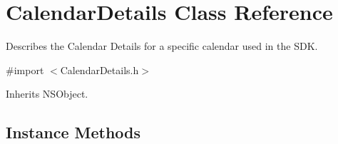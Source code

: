 \hypertarget{interface_calendar_details}{}\section{Calendar\+Details Class Reference}
\label{interface_calendar_details}


Describes the Calendar Details for a specific calendar used in the S\+D\+K.  




{\ttfamily \#import $<$Calendar\+Details.\+h$>$}



Inherits N\+S\+Object.

\subsection*{Instance Methods}
